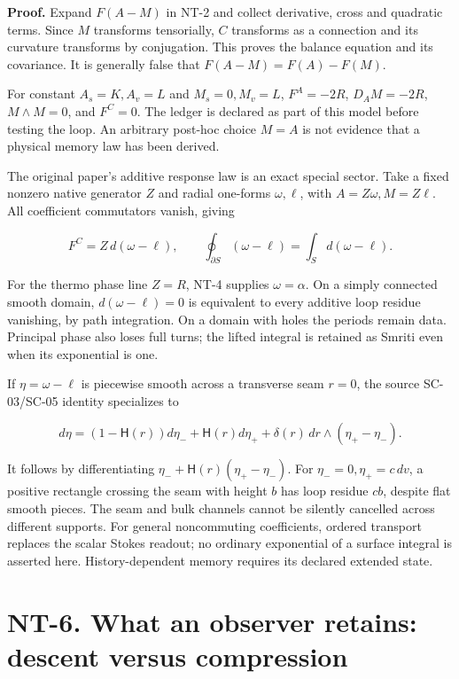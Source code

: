 \documentclass[
  11pt,
]{article}
\begin{document}
\textbf{Proof.} Expand \(F(A-M)\) in NT-2 and collect derivative, cross
and quadratic terms. Since \(M\) transforms tensorially, \(C\)
transforms as a connection and its curvature transforms by conjugation.
This proves the balance equation and its covariance. It is generally
false that \(F(A-M)=F(A)-F(M)\).

For constant \(A_s=K,A_v=L\) and \(M_s=0,M_v=L\), \(F^A=-2R\),
\(D_A M=-2R\), \(M\wedge M=0\), and \(F^C=0\). The ledger is declared as
part of this model before testing the loop. An arbitrary post-hoc choice
\(M=A\) is not evidence that a physical memory law has been derived.

The original paper's additive response law is an exact special sector.
Take a fixed nonzero native generator \(Z\) and radial one-forms
\(\omega,\ell\), with \(A=Z\omega,M=Z\ell\). All coefficient commutators
vanish, giving

\[
F^C=Z\,d(\omega-\ell),\qquad
\oint_{\partial S}(\omega-\ell)=\int_S d(\omega-\ell).
\]

For the thermo phase line \(Z=R\), NT-4 supplies \(\omega=\alpha\). On a
simply connected smooth domain, \(d(\omega-\ell)=0\) is equivalent to
every additive loop residue vanishing, by path integration. On a domain
with holes the periods remain data. Principal phase also loses full
turns; the lifted integral is retained as Smriti even when its
exponential is one.

If \(\eta=\omega-\ell\) is piecewise smooth across a transverse seam
\(r=0\), the source SC-03/SC-05 identity specializes to

\[
d\eta=(1-\mathsf H(r))d\eta_-+\mathsf H(r)d\eta_+
       +\delta(r)\,dr\wedge(\eta_+-\eta_-).
\]

It follows by differentiating \(\eta_-+\mathsf H(r)(\eta_+-\eta_-)\).
For \(\eta_-=0,\eta_+=c\,dv\), a positive rectangle crossing the seam
with height \(b\) has loop residue \(cb\), despite flat smooth pieces.
The seam and bulk channels cannot be silently cancelled across different
supports. For general noncommuting coefficients, ordered transport
replaces the scalar Stokes readout; no ordinary exponential of a surface
integral is asserted here. History-dependent memory requires its
declared extended state.

\hypertarget{nt-6.-what-an-observer-retains-descent-versus-compression}{%
\section{NT-6. What an observer retains: descent versus
compression}\label{nt-6.-what-an-observer-retains-descent-versus-compression}}
\end{document}
